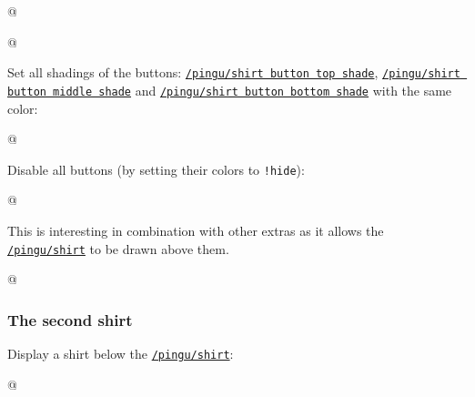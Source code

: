 \documentclass[parskip=half,english,numbers=noenddot,footnotes=nomultiple,oneside]{scrartcl}
\def\lpingu#1{\lstinline[style=lstpingu,language=pingulang]'#1'}
\newcommand*\keyref[2][/pingu/]{\hyperref[pk:#1#2]{\lpingu{#1#2}}}
\begin{document}
{\def\pingu@color@shirt@button@middle{<shirt-button-middle>}\def\pingu@color@shirt{<shirt-color>}
\begin{tcblisting}{@}
\begin{tikzpicture}
	\pingu[shirt, shirt button middle shade=green]
\end{tikzpicture}
\end{tcblisting}
\endsubkeyexplain}

{\def\pingu@color@shirt@button@top{<shirt-button-top>}\def\pingu@color@shirt{<shirt-color>}
\begin{tcblisting}{@}
\begin{tikzpicture}
	\pingu[shirt, shirt button bottom shade=green]
\end{tikzpicture}
\end{tcblisting}
\endsubkeyexplain}

Set all shadings of the buttons: \keyref{shirt button top shade}, \keyref{shirt button middle shade} and \keyref{shirt button bottom shade} with the same color:
\begin{tcblisting}{@}
\begin{tikzpicture}
	\pingu[shirt, shirt buttons shade=green]
\end{tikzpicture}
\end{tcblisting}
\endsubkeyexplain

Disable all buttons (by setting their colors to \lpingu{!hide}):
\begin{tcblisting}{@}
\end{tcblisting}
\endsubkeyexplain

This is interesting in combination with other extras as it allows the \keyref{shirt} to be drawn above them.
\begin{tcblisting}{@}
\end{tcblisting}
\endsubkeyexplain

\subsubsection{The second shirt}
	Display a shirt below the \keyref{shirt}:
\begin{tcblisting}{@}
\begin{tikzpicture}
	\pingu[second shirt=green, shirt]
\end{tikzpicture}
\end{tcblisting}
\endshowkeyexplain
\end{document}
